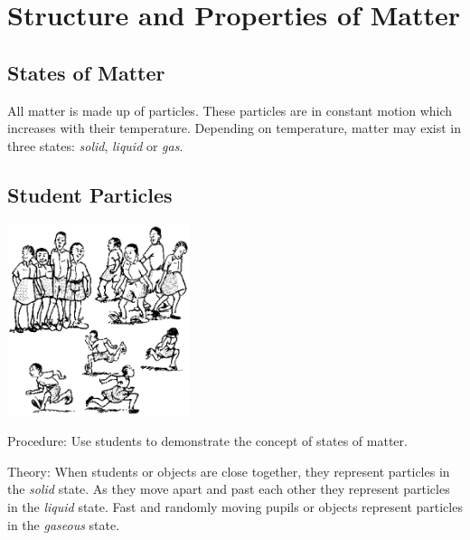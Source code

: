 \section{Structure and Properties of Matter}

\begin{multicols}{2}

\section*{States of Matter}
All matter is made up of particles. These particles are in constant motion which increases with their temperature. Depending on temperature, matter may exist in three states: \emph{solid}, \emph{liquid} or \emph{gas}.


\subsection{Student Particles}

\begin{center}
\includegraphics[width=0.4\textwidth]{./img/source/states-matter.png}
\end{center}

\begin{description*}
\item[Procedure:]{Use students to demonstrate the concept of states of matter.}
\item[Theory:]{When students or objects are close together, they represent particles in the \emph{solid} state. As they move apart and past each other they represent particles in the \emph{liquid} state. Fast and randomly moving pupils or objects represent particles in the \emph{gaseous} state.}
\end{description*}


\end{multicols}
